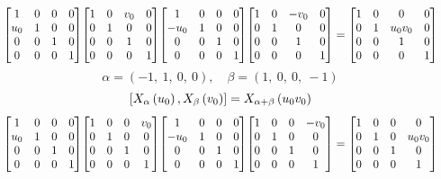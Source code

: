 \documentclass[11pt]{article}
\theoremstyle{definition}
\begin{document}
\[
\scaletoalign{\textwidth}{{\left[\begin{matrix}1 & 0 & 0 & 0\\u_{0} & 1 & 0 & 0\\0 & 0 & 1 & 0\\0 & 0 & 0 & 1\end{matrix}\right]} {\left[\begin{matrix}1 & 0 & v_{0} & 0\\0 & 1 & 0 & 0\\0 & 0 & 1 & 0\\0 & 0 & 0 & 1\end{matrix}\right]} {\left[\begin{matrix}1 & 0 & 0 & 0\\- u_{0} & 1 & 0 & 0\\0 & 0 & 1 & 0\\0 & 0 & 0 & 1\end{matrix}\right]} {\left[\begin{matrix}1 & 0 & - v_{0} & 0\\0 & 1 & 0 & 0\\0 & 0 & 1 & 0\\0 & 0 & 0 & 1\end{matrix}\right]} = {\left[\begin{matrix}1 & 0 & 0 & 0\\0 & 1 & u_{0} v_{0} & 0\\0 & 0 & 1 & 0\\0 & 0 & 0 & 1\end{matrix}\right]}}
\]
\[
\alpha = \left( -1, \  1, \  0, \  0\right), \quad \beta = \left( 1, \  0, \  0, \  -1\right)
\]
\[
\scaletoalign{\textwidth}{\left[ X_{\alpha}\left(u_{0}\right), X_{\beta}\left(v_{0}\right) \right] = X_{\alpha + \beta}\left(u_{0} v_{0}\right)}
\]
\[
\scaletoalign{\textwidth}{{\left[\begin{matrix}1 & 0 & 0 & 0\\u_{0} & 1 & 0 & 0\\0 & 0 & 1 & 0\\0 & 0 & 0 & 1\end{matrix}\right]} {\left[\begin{matrix}1 & 0 & 0 & v_{0}\\0 & 1 & 0 & 0\\0 & 0 & 1 & 0\\0 & 0 & 0 & 1\end{matrix}\right]} {\left[\begin{matrix}1 & 0 & 0 & 0\\- u_{0} & 1 & 0 & 0\\0 & 0 & 1 & 0\\0 & 0 & 0 & 1\end{matrix}\right]} {\left[\begin{matrix}1 & 0 & 0 & - v_{0}\\0 & 1 & 0 & 0\\0 & 0 & 1 & 0\\0 & 0 & 0 & 1\end{matrix}\right]} = {\left[\begin{matrix}1 & 0 & 0 & 0\\0 & 1 & 0 & u_{0} v_{0}\\0 & 0 & 1 & 0\\0 & 0 & 0 & 1\end{matrix}\right]}}
\]
\end{document}
